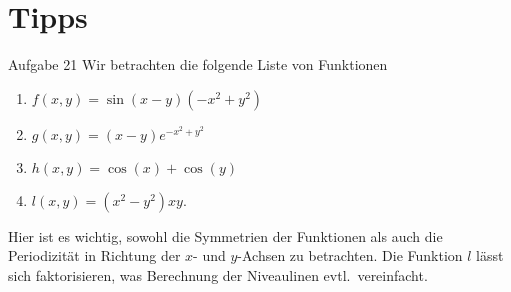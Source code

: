\documentclass[12pt]{article}
\begin{document}


\section{Tipps}
\setcounter{nexc}{1}

\begin{nexercise}{Aufgabe 2}{1}
        Wir betrachten die folgende Liste von Funktionen

        \begin{varwidth}{\textwidth}
                \begin{enumerate}[label=(\alph*)]
                        \item $f(x,y)=\sin(x-y)(-x^2+y^2)$
                        \item $g(x,y)=(x-y)e^{-x^2+y^2}$
                        \item $h(x,y)=\cos(x)+\cos(y)$
                        \item $l(x,y)=(x^2-y^2)xy.$
                \end{enumerate}
        \end{varwidth}
\end{nexercise}

\begin{tips}{1}
        Hier ist es wichtig, sowohl die Symmetrien der Funktionen als auch die Periodizität in Richtung der $x$- und $y$-Achsen zu betrachten. Die Funktion $l$ lässt sich faktorisieren, was Berechnung der Niveaulinen evtl.\ vereinfacht.
\end{tips}
\end{document}
